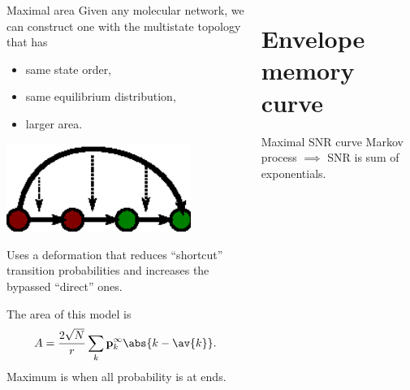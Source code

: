 \documentclass[final,hyperref={pdfpagelabels=false,bookmarks=false}]{beamer}
\newcommand{\net}{molecular network}
\newcommand{\eq}{\mathbf{p}^\infty}
\begin{document}
\begin{frame}{}
\begin{columns}[t]
\begin{column}{0.37\linewidth}

\begin{block}{Maximal area}
%
 Given any \net, we can construct one with the multistate topology that has
\parbox[c]{15cm}{
 \begin{itemize}
   \item same state order,
   \item same equilibrium distribution,
   \item larger area.
 \end{itemize}
}
\parbox[c]{15cm}{
 \begin{center}
   \includegraphics[width=6cm]{shortcut.eps}
 \end{center}
}

 Uses a deformation that reduces ``shortcut'' transition probabilities and increases the bypassed ``direct'' ones.

 \vp The area of this model is
 \begin{equation*}
   A = \frac{2\sqrt{N}}{r}\sum_k \eq_k \abs{k-\av{k}}.
 \end{equation*}
 Maximum is when all probability is at ends.
%
\end{block}





\end{column}

\begin{column}{0.32\linewidth}



\section{Envelope memory curve}



\begin{block}{Maximal SNR curve}
%
 Markov process $\implies$ SNR is sum of exponentials.


\end{block}
\end{column}
\end{columns}
\end{frame}
\end{document}
